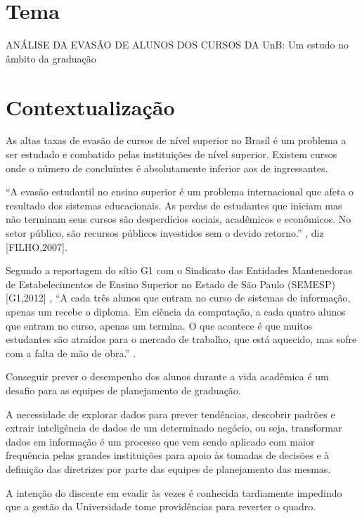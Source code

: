 \section{Tema}%
ANÁLISE DA EVASÃO DE ALUNOS DOS CURSOS DA UnB: Um estudo no âmbito da graduação

\section{Contextualização}%

As altas taxas de evasão de cursos de nível superior no Brasil é um problema a ser estudado e combatido pelas instituições de nível superior. Existem cursos onde o  número de concluintes é absolutamente inferior aos de ingressantes.

 “A evasão estudantil no ensino superior é um problema internacional que afeta o resultado dos sistemas educacionais. As perdas de estudantes que iniciam mas não terminam seus cursos são desperdícios sociais, acadêmicos e econômicos. No setor público, são recursos públicos investidos sem o devido retorno.” , diz [FILHO,2007].%

Segundo a reportagem do sítio G1 com o Sindicato das Entidades Mantenedoras de Estabelecimentos de Ensino Superior no Estado de São Paulo (SEMESP) [G1,2012] %
, “A cada três alunos que entram no curso de sistemas de informação, apenas um recebe o diploma.  Em ciência da computação, a cada quatro alunos que entram no curso, apenas um termina. O que acontece é que muitos estudantes são atraídos para o mercado de trabalho, que está aquecido, mas sofre com a falta de mão de obra.” . 

Conseguir prever o desempenho dos alunos durante a vida acadêmica é um desafio para as equipes de planejamento de graduação. 

A necessidade de explorar dados para prever tendências, descobrir padrões e extrair inteligência de dados de um determinado negócio, ou seja, transformar dados em informação é um processo que vem sendo aplicado com  maior frequência pelas grandes instituições para apoio às tomadas de decisões e à definição das diretrizes por parte das equipes de planejamento das mesmas.

A intenção do discente em evadir às vezes é conhecida tardiamente impedindo que a gestão da Universidade tome providências para reverter o quadro.

